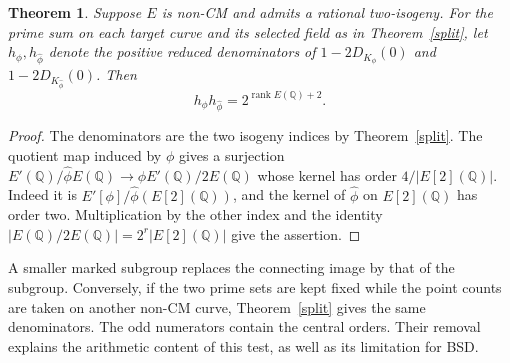 \documentclass[11pt]{article}
\newtheorem{theorem}{Theorem}[section]\newtheorem{prop}[theorem]{Proposition}
\newcommand{\Q}{\mathbb Q}\newcommand{\Z}{\mathbb Z}\newcommand{\F}{\mathbb F}
\begin{document}
\begin{theorem}
Suppose $E$ is non-CM and admits a rational two-isogeny. For the prime sum on each target curve and its selected field as in Theorem~\ref{split}, let $h_\phi,h_{\widehat\phi}$ denote the positive reduced denominators of $1-2D_{K_\phi}(0)$ and $1-2D_{K_{\widehat\phi}}(0)$. Then
\[
 h_\phi h_{\widehat\phi}=2^{\operatorname{rank}E(\Q)+2}.
\]
\end{theorem}
\begin{proof}
The denominators are the two isogeny indices by Theorem~\ref{split}. The quotient map induced by $\phi$ gives a surjection
$E'(\Q)/\widehat\phi E(\Q)\to\phi E'(\Q)/2E(\Q)$
whose kernel has order $4/|E[2](\Q)|$. Indeed it is $E'[\phi]/\widehat\phi(E[2](\Q))$, and the kernel of $\widehat\phi$ on $E[2](\Q)$ has order two. Multiplication by the other index and the identity $|E(\Q)/2E(\Q)|=2^r|E[2](\Q)|$ give the assertion.
\end{proof}
A smaller marked subgroup replaces the connecting image by that of the subgroup. Conversely, if the two prime sets are kept fixed while the point counts are taken on another non-CM curve, Theorem~\ref{split} gives the same denominators. The odd numerators contain the central orders. Their removal explains the arithmetic content of this test, as well as its limitation for BSD.
\end{document}
